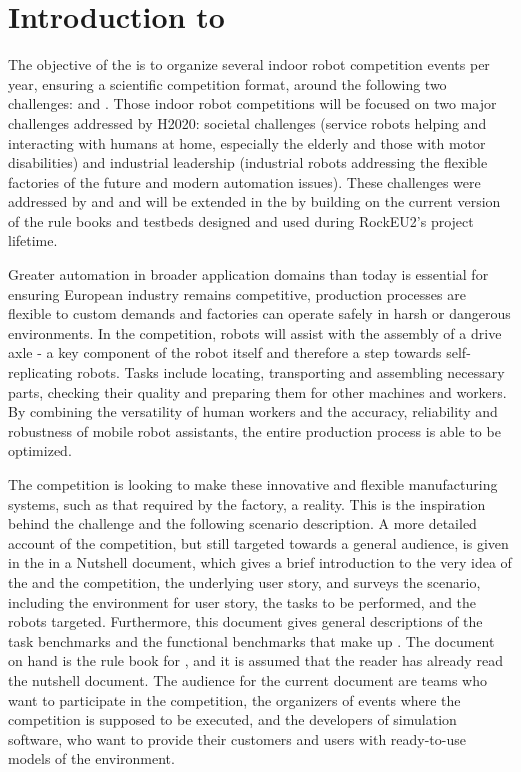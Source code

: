 

\section{Introduction to \erlir}
\label{sec:Intro}
The objective of the \erl is to organize several indoor robot competition events per year, ensuring a
scientific competition format, around the following two challenges: \erlsr and \erlir.
Those indoor robot competitions will be focused on two major challenges addressed by H2020: societal
challenges (service robots helping and interacting with humans at home, especially the elderly and
those with motor disabilities) and industrial leadership (industrial robots addressing the flexible factories of the future and modern automation issues). These challenges were addressed by \ro and \rockeutwo and will be extended in the \erl by building on the current version of the
rule books and testbeds designed and used during RockEU2’s project lifetime.


Greater automation in broader application domains than today is essential for ensuring European industry remains competitive, production processes are flexible to custom demands and factories can operate safely in harsh or dangerous environments.  
In the \erlir competition, robots will assist with the assembly of a drive axle - a key component of the robot itself and therefore a step towards self-replicating robots. 
Tasks include locating, transporting and assembling necessary parts, checking their quality and preparing them for other machines and workers. 
By combining the versatility of human workers and the accuracy, reliability and robustness of mobile robot assistants, the entire production process is able to be optimized. 

The \erlir competition is looking to make these innovative and flexible manufacturing systems, such as that required by the \rollin factory, a reality. 
This is the inspiration behind the challenge and the following scenario description.
A more detailed account of the \erlir competition, but still targeted towards a general audience, is given in the \erlir in a Nutshell document, which gives a brief introduction to the very idea of the \erl and the \erlir competition, the underlying user story, and surveys the scenario, including the environment for user story, the tasks to be performed, and the robots targeted.
Furthermore, this document gives general descriptions of the task benchmarks and the functional benchmarks that make up \erlir. 
The document on hand is the rule book for \erlir, and it is assumed that the reader has already read the nutshell document. 
The audience for the current document are teams who want to participate in the competition, the organizers of events where the \erlir competition is supposed to be executed, and the developers of simulation software, who want to provide their customers and users with ready-to-use models of the environment. 


